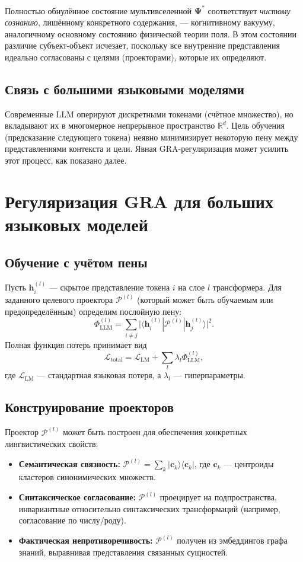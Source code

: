 \documentclass[11pt]{article}
\newcommand{\cP}{\mathcal{P}}
\begin{document}
Полностью обнулённое состояние мультивселенной $\mathbf{\Psi}^*$ соответствует \emph{чистому сознанию}, лишённому конкретного содержания, --- когнитивному вакууму, аналогичному основному состоянию физической теории поля. В этом состоянии различие субъект-объект исчезает, поскольку все внутренние представления идеально согласованы с целями (проекторами), которые их определяют.

\subsection{Связь с большими языковыми моделями}
Современные LLM оперируют дискретными токенами (счётное множество), но вкладывают их в многомерное непрерывное пространство $\mathbb{R}^d$. Цель обучения (предсказание следующего токена) неявно минимизирует некоторую пену между представлениями контекста и цели. Явная GRA-регуляризация может усилить этот процесс, как показано далее.

\section{Регуляризация GRA для больших языковых моделей}
\label{sec:llm}

\subsection{Обучение с учётом пены}
Пусть $\mathbf{h}_i^{(l)}$ --- скрытое представление токена $i$ на слое $l$ трансформера. Для заданного целевого проектора $\cP^{(l)}$ (который может быть обучаемым или предопределённым) определим послойную пену:
\[
\Phi_{\text{LLM}}^{(l)} = \sum_{i \neq j} \bigl| \langle \mathbf{h}_i^{(l)} | \cP^{(l)} | \mathbf{h}_j^{(l)} \rangle \bigr|^2.
\]
Полная функция потерь принимает вид
\[
\mathcal{L}_{\text{total}} = \mathcal{L}_{\text{LM}} + \sum_{l} \lambda_l \Phi_{\text{LLM}}^{(l)},
\]
где $\mathcal{L}_{\text{LM}}$ --- стандартная языковая потеря, а $\lambda_l$ --- гиперпараметры.

\subsection{Конструирование проекторов}
Проектор $\cP^{(l)}$ может быть построен для обеспечения конкретных лингвистических свойств:
\begin{itemize}
    \item \textbf{Семантическая связность:} $\cP^{(l)} = \sum_{k} |\mathbf{c}_k\rangle\langle \mathbf{c}_k|$, где $\mathbf{c}_k$ --- центроиды кластеров синонимических множеств.
    \item \textbf{Синтаксическое согласование:} $\cP^{(l)}$ проецирует на подпространства, инвариантные относительно синтаксических трансформаций (например, согласование по числу/роду).
    \item \textbf{Фактическая непротиворечивость:} $\cP^{(l)}$ получен из эмбеддингов графа знаний, выравнивая представления связанных сущностей.
\end{itemize}
\end{document}
